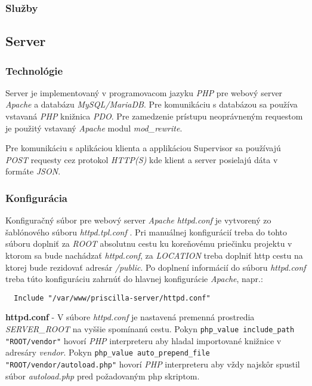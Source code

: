 \documentclass{article}
\newcommand{\filedesc}[1]{\vspace{0.3cm} \noindent \textbf{#1}}
\newcommand{\file}[1]{\emph{#1}}
\begin{document}
\subsubsection{Služby}

\subsection{Server}

\subsubsection{Technológie}
Server je implementovaný v programovacom jazyku \emph{PHP} pre webový server \emph{Apache} a databázu \emph{MySQL/MariaDB}. Pre komunikáciu s databázou sa používa vstavaná \emph{PHP} knižnica \emph{PDO}.
Pre zamedzenie prístupu neoprávneným requestom je použitý vstavaný \emph{Apache} modul \emph{mod{\_}rewrite}.

Pre komunikáciu s aplikáciou klienta a applikáciou Supervisor sa používajú \emph{POST} requesty cez protokol \emph{HTTP(S)} kde klient a server posielajú dáta v formáte \emph{JSON}.

\subsubsection{Konfigurácia}

Konfiguračný súbor pre webový server \emph{Apache} \file{httpd.conf} je vytvorený zo šablónového súboru \file{httpd.tpl.conf} . Pri manuálnej konfigurácií treba do tohto súboru doplniť za \emph{ROOT} absolutnu cestu ku koreňovému priečinku projektu v ktorom sa bude nachádzať \file{httpd.conf}, za \emph{LOCATION} treba doplniť http cestu na ktorej bude rezidovať adresár \file{/public}. Po doplnení informácií do súboru \file{httpd.conf} treba túto konfiguráciu zahrnúť do hlavnej konfigurácie \emph{Apache}, napr.:

\begin{verbatim}
  Include "/var/www/priscilla-server/httpd.conf"
\end{verbatim}

\filedesc{httpd.conf} - V súbore \file{httpd.conf} je nastavená premenná prostredia \emph{SERVER{\_}ROOT} na vyššie spomínanú cestu. Pokyn \texttt{php_value include_path "ROOT/vendor"} hovorí \emph{PHP} interpreteru aby hladal importované knižnice v adresáry \file{vendor}. Pokyn \texttt{php_value auto_prepend_file "ROOT/vendor/autoload.php"} hovorí \emph{PHP} interpreteru aby vždy najskôr spustil súbor \file{autoload.php} pred požadovaným php skriptom.
\end{document}
